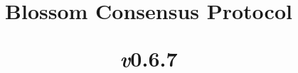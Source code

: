 \documentclass{apa7}
\title{Blossom Consensus Protocol

\small\textit{v}0.6.7}
\begin{document}
\maketitle
% 

\twocolumn
\tableofcontents











\onecolumn


\end{document}
